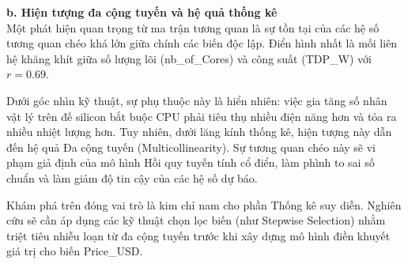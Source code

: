 \documentclass[12pt, a4paper]{article}
\begin{document}
\textbf{b. Hiện tượng đa cộng tuyến và hệ quả thống kê}\\
Một phát hiện quan trọng từ ma trận tương quan là sự tồn tại của các hệ số tương quan chéo khá lớn giữa chính các biến độc lập. Điển hình nhất là mối liên hệ khăng khít giữa số lượng lõi (nb\_of\_Cores) và công suất (TDP\_W) với $r = 0.69$.

Dưới góc nhìn kỹ thuật, sự phụ thuộc này là hiển nhiên: việc gia tăng số nhân vật lý trên đế silicon bắt buộc CPU phải tiêu thụ nhiều điện năng hơn và tỏa ra nhiều nhiệt lượng hơn. Tuy nhiên, dưới lăng kính thống kê, hiện tượng này dẫn đến hệ quả Đa cộng tuyến (Multicollinearity). Sự tương quan chéo này sẽ vi phạm giả định của mô hình Hồi quy tuyến tính cổ điển, làm phình to sai số chuẩn và làm giảm độ tin cậy của các hệ số dự báo. 

Khám phá trên đóng vai trò là kim chỉ nam cho phần Thống kê suy diễn. Nghiên cứu sẽ cần áp dụng các kỹ thuật chọn lọc biến (như Stepwise Selection) nhằm triệt tiêu nhiễu loạn từ đa cộng tuyến trước khi xây dựng mô hình điền khuyết giá trị cho biến Price\_USD.
\end{document}
